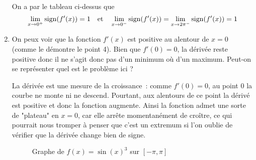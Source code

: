 \begin{exercice}
\begin{enumerate}
    On a par le tableau ci-dessus que
    \[
    \lim_{x \to 0^+} \operatorname{sign}(f'(x)) = 1 \quad \textrm{et} \quad \lim_{x \to 0^-} \operatorname{sign}(f'(x)) = \lim_{x \to 2\pi^-} \operatorname{sign}(f'(x)) = 1
    \]
    
    \item On peux voir que la fonction $f'(x)$ est positive au alentour de $x = 0$ (comme le démontre le point 4). Bien que $f'(0) = 0$, la dérivée reste positive donc il ne s'agit donc pas d'un minimum où d'un maximum. Peut-on se représenter quel est le problème ici ?
    
    La dérivée est une mesure de la croissance~: comme $f'(0) = 0$, au point $0$ la courbe ne monte ni ne descend. Pourtant, aux alentours de ce point la dérivé est positive et donc la fonction augmente. Ainsi la fonction admet une sorte de "plateau" en $x = 0$, car elle arrête momentanément de croître, ce qui pourrait nous tromper à penser que c'est un extremum si l'on oublie de vérifier que la dérivée change bien de signe.
    
    \begin{figure}[H]
        \centering
        \caption{Graphe de $f(x) = \sin(x)^3$ sur $[-\pi, \pi]$}
        \label{fig:sin_cubed}
    \end{figure}
\end{enumerate}
\end{exercice}

